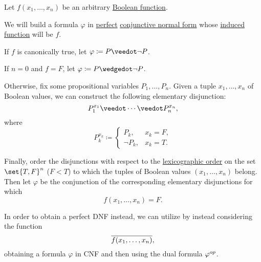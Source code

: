 \begin{algorithm}\label{alg:perfect_cnf_and_dnf}
  Let \( f(x_1, \ldots, x_n) \) be an arbitrary \hyperref[def:boolean_function]{Boolean function}.

  We will build a formula \( \varphi \) in \hyperref[def:perfect_cnf_and_dnf]{perfect} \hyperref[def:cnf_and_dnf]{conjunctive normal form} whose \hyperref[def:propositional_valuation/valuation_function]{induced function} will be \( f \).

  \begin{thmenum}
     If \( f \) is canonically true, let \( \varphi \coloneqq P \synvee \neg P \).

     If \( n = 0 \) and \( f = F \), let \( \varphi \coloneqq P \synwedge \neg P \).

     Otherwise, fix some propositional variables \( P_1, \ldots, P_n \). Given a tuple \( x_1, \ldots, x_n \) of Boolean values, we can construct the following elementary disjunction:
    \begin{equation}\label{alg:perfect_cnf_and_dnf/cnf}
      P_1^{x_1} \synvee \cdots \synvee P_n^{x_n},
    \end{equation}
    where
    \begin{equation*}
      P_k^{x_k} \coloneqq \begin{cases}
        P_k,      &x_k = F, \\
        \neg P_k, &x_k = T.
      \end{cases}
    \end{equation*}

     Finally, order the disjunctions with respect to the \hyperref[def:lexicographic_order]{lexicographic order} on the set \( \set{ T, F }^n \) (\( F < T \)) to which the tuples of Boolean values \( (x_1, \ldots, x_n) \) belong. Then let \( \varphi \) be the conjunction of the corresponding elementary disjunctions for which
    \begin{equation*}
      f(x_1, \ldots, x_n) = F.
    \end{equation*}

     In order to obtain a perfect DNF instead, we can utilize  by instead considering the function
    \begin{equation*}
      \oline{f(x_1, \ldots, x_n)},
    \end{equation*}
    obtaining a formula \( \varphi \) in CNF and then using the dual formula \( \varphi^{op} \).
  \end{thmenum}
\end{algorithm}
